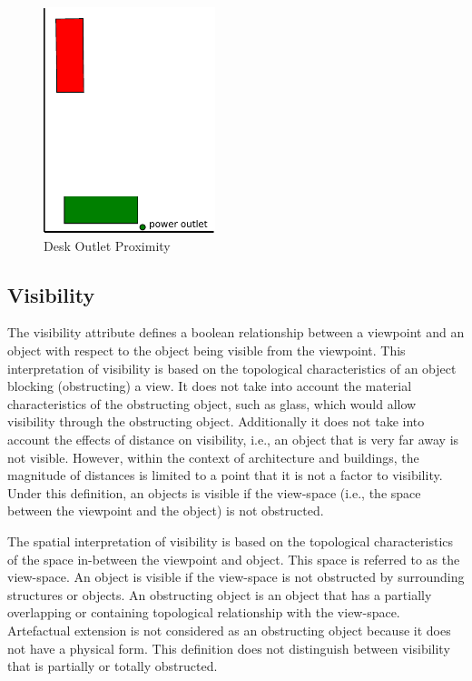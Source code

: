 \documentclass[12pt]{ucthesis}
\begin{document}
\begin{figure}[H]
 \centering
 \includegraphics[width=50mm]{desk-proximity}
 \caption{Desk Outlet Proximity}
\label{desk-proximity}
\end{figure}

\subsection{Visibility}
The visibility attribute defines a boolean relationship between a viewpoint and an object with respect to the object being visible from the viewpoint. This interpretation of visibility is based on the topological characteristics of an object blocking (obstructing) a view. It does not take into account the material characteristics of the obstructing object, such as glass, which would allow visibility through the obstructing object. Additionally it does not take into account the effects of distance on visibility, i.e., an object that is very far away is not visible. However, within the context of architecture and buildings, the magnitude of distances is limited to a point that it is not a factor to visibility. Under this definition, an objects is visible if the view-space (i.e., the space between the viewpoint and the object) is not obstructed.

The spatial interpretation of visibility is based on the topological characteristics of the space in-between the viewpoint and object. This space is referred to as the view-space. An object is visible if the view-space is not obstructed by surrounding structures or objects. An obstructing object is an object that has a partially overlapping or containing topological relationship with the view-space. Artefactual extension is not considered as an obstructing object because it does not have a physical form. This definition does not distinguish between visibility that is partially or totally obstructed.
\end{document}
